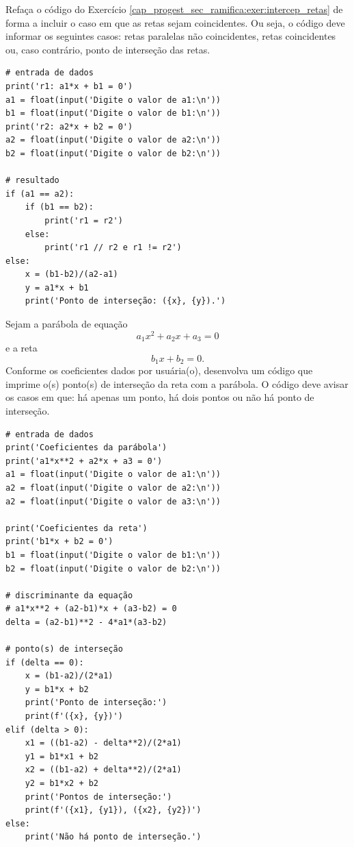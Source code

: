 \begin{exer}
  Refaça o código do Exercício \ref{cap_progest_sec_ramifica:exer:intercep_retas} de forma a incluir o caso em que as retas sejam coincidentes. Ou seja, o código deve informar os seguintes casos: retas paralelas não coincidentes, retas coincidentes ou, caso contrário, ponto de interseção das retas.
\end{exer}
\begin{resp}
\begin{lstlisting}
# entrada de dados
print('r1: a1*x + b1 = 0')
a1 = float(input('Digite o valor de a1:\n'))
b1 = float(input('Digite o valor de b1:\n'))
print('r2: a2*x + b2 = 0')
a2 = float(input('Digite o valor de a2:\n'))
b2 = float(input('Digite o valor de b2:\n'))

# resultado
if (a1 == a2):
    if (b1 == b2):
        print('r1 = r2')
    else:
        print('r1 // r2 e r1 != r2')
else:
    x = (b1-b2)/(a2-a1)
    y = a1*x + b1
    print('Ponto de interseção: ({x}, {y}).')
\end{lstlisting}
\end{resp}

\begin{exer}
  Sejam a parábola de equação
  \begin{equation}
    a_1x^2 + a_2x + a_3 = 0
  \end{equation}
  e a reta
  \begin{equation}
    b_1x + b_2 = 0.
  \end{equation}
  Conforme os coeficientes dados por usuária(o), desenvolva um código que imprime o(s) ponto(s) de interseção da reta com a parábola. O código deve avisar os casos em que: há apenas um ponto, há dois pontos ou não há ponto de interseção.
\end{exer}
\begin{resp}
\begin{lstlisting}
# entrada de dados
print('Coeficientes da parábola')
print('a1*x**2 + a2*x + a3 = 0')
a1 = float(input('Digite o valor de a1:\n'))
a2 = float(input('Digite o valor de a2:\n'))
a2 = float(input('Digite o valor de a3:\n'))

print('Coeficientes da reta')
print('b1*x + b2 = 0')
b1 = float(input('Digite o valor de b1:\n'))
b2 = float(input('Digite o valor de b2:\n'))

# discriminante da equação
# a1*x**2 + (a2-b1)*x + (a3-b2) = 0
delta = (a2-b1)**2 - 4*a1*(a3-b2)

# ponto(s) de interseção
if (delta == 0):
    x = (b1-a2)/(2*a1)
    y = b1*x + b2
    print('Ponto de interseção:')
    print(f'({x}, {y})')
elif (delta > 0):
    x1 = ((b1-a2) - delta**2)/(2*a1)
    y1 = b1*x1 + b2
    x2 = ((b1-a2) + delta**2)/(2*a1)
    y2 = b1*x2 + b2
    print('Pontos de interseção:')
    print(f'({x1}, {y1}), ({x2}, {y2})')
else:
    print('Não há ponto de interseção.')
\end{lstlisting}
\end{resp}

